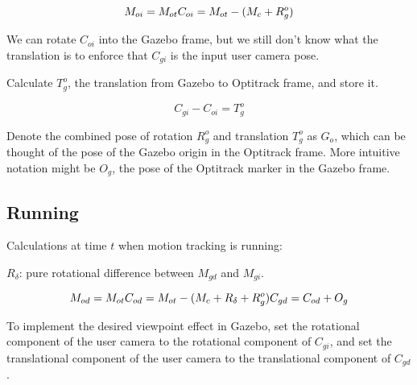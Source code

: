 \documentclass[11pt, letterpaper]{article}
\begin{document}
\[M_{oi} = M_{ot}\\
C_{oi} = M_{ot} - (M_c + R^o_g)\]

We can rotate $C_{oi}$ into the Gazebo frame, but we still don't know what the translation is to enforce that $C_{gi}$ is the input user camera pose.

Calculate $T^o_g$, the translation from Gazebo to Optitrack frame, and store it.

\[C_{gi} - C_{oi} = T^o_g\]

Denote the combined pose of rotation $R^o_g$ and translation $T^o_g$ as $G_o$, which can be thought of the pose of the Gazebo origin in the Optitrack frame. More intuitive notation might be $O_g$, the pose of the Optitrack marker in the Gazebo frame.

\subsection{Running}
Calculations at time $t$ when motion tracking is running:

$R_{\delta}$: pure rotational difference between $M_{gd}$ and $M_{gi}$.

\[M_{od} = M_{ot}\\
C_{od} = M_{ot} - (M_c + R_{\delta} + R^o_g)\\
C_{gd} = C_{od} + O_g\]

To implement the desired viewpoint effect in Gazebo, set the rotational component of the user camera to the rotational component of $C_{gi}$, and set the translational component of the user camera to the translational component of $C_{gd}$.
\end{document}
